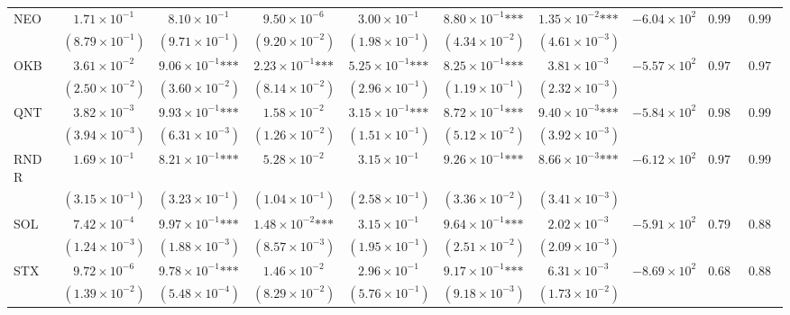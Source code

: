 \documentclass{article}
\begin{document}
\begin{landscape}
\begin{longtable}{lccccccccc}
NEO & $1.71\times 10^{-1}$ & $8.10\times 10^{-1}$ & $9.50\times 10^{-6}$ & $3.00\times 10^{-1}$ & $8.80\times 10^{-1}\text{***}$ & $1.35\times 10^{-2}\text{***}$ & $-6.04\times 10^{2}$ & $0.996$ & $0.998$ \\
 & $(8.79\times 10^{-1})$ & $(9.71\times 10^{-1})$ & $(9.20\times 10^{-2})$ & $(1.98\times 10^{-1})$ & $(4.34\times 10^{-2})$ & $(4.61\times 10^{-3})$ &  &  &  \\
OKB & $3.61\times 10^{-2}$ & $9.06\times 10^{-1}\text{***}$ & $2.23\times 10^{-1}\text{***}$ & $5.25\times 10^{-1}\text{***}$ & $8.25\times 10^{-1}\text{***}$ & $3.81\times 10^{-3}$ & $-5.57\times 10^{2}$ & $0.972$ & $0.972$ \\
 & $(2.50\times 10^{-2})$ & $(3.60\times 10^{-2})$ & $(8.14\times 10^{-2})$ & $(2.96\times 10^{-1})$ & $(1.19\times 10^{-1})$ & $(2.32\times 10^{-3})$ &  &  &  \\
QNT & $3.82\times 10^{-3}$ & $9.93\times 10^{-1}\text{***}$ & $1.58\times 10^{-2}$ & $3.15\times 10^{-1}\text{***}$ & $8.72\times 10^{-1}\text{***}$ & $9.40\times 10^{-3}\text{***}$ & $-5.84\times 10^{2}$ & $0.983$ & $0.991$ \\
 & $(3.94\times 10^{-3})$ & $(6.31\times 10^{-3})$ & $(1.26\times 10^{-2})$ & $(1.51\times 10^{-1})$ & $(5.12\times 10^{-2})$ & $(3.92\times 10^{-3})$ &  &  &  \\
RNDR & $1.69\times 10^{-1}$ & $8.21\times 10^{-1}\text{***}$ & $5.28\times 10^{-2}$ & $3.15\times 10^{-1}$ & $9.26\times 10^{-1}\text{***}$ & $8.66\times 10^{-3}\text{***}$ & $-6.12\times 10^{2}$ & $0.973$ & $0.991$ \\
 & $(3.15\times 10^{-1})$ & $(3.23\times 10^{-1})$ & $(1.04\times 10^{-1})$ & $(2.58\times 10^{-1})$ & $(3.36\times 10^{-2})$ & $(3.41\times 10^{-3})$ &  &  &  \\
SOL & $7.42\times 10^{-4}$ & $9.97\times 10^{-1}\text{***}$ & $1.48\times 10^{-2}\text{***}$ & $3.15\times 10^{-1}$ & $9.64\times 10^{-1}\text{***}$ & $2.02\times 10^{-3}$ & $-5.91\times 10^{2}$ & $0.798$ & $0.881$ \\
 & $(1.24\times 10^{-3})$ & $(1.88\times 10^{-3})$ & $(8.57\times 10^{-3})$ & $(1.95\times 10^{-1})$ & $(2.51\times 10^{-2})$ & $(2.09\times 10^{-3})$ &  &  &  \\
STX & $9.72\times 10^{-6}$ & $9.78\times 10^{-1}\text{***}$ & $1.46\times 10^{-2}$ & $2.96\times 10^{-1}$ & $9.17\times 10^{-1}\text{***}$ & $6.31\times 10^{-3}$ & $-8.69\times 10^{2}$ & $0.681$ & $0.883$ \\
 & $(1.39\times 10^{-2})$ & $(5.48\times 10^{-4})$ & $(8.29\times 10^{-2})$ & $(5.76\times 10^{-1})$ & $(9.18\times 10^{-3})$ & $(1.73\times 10^{-2})$ &  &  &  \\

\end{longtable}
\end{landscape}
\end{document}
